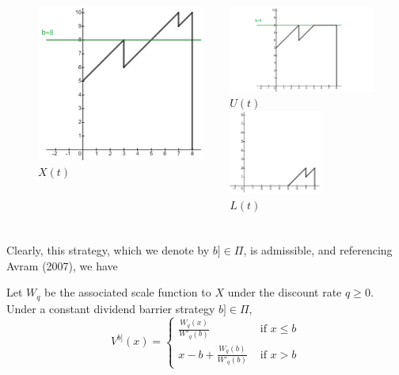 \documentclass[xcolor=pdftex,dvipsnames,table]{beamer}
\theoremstyle{definition}
\begin{document}
\begin{frame}
\frametitle{\insertsectionhead}
\begin{figure}
\begin{columns}
\begin{column}{0.5\textwidth}
\begin{center}
\includegraphics [width=2.2in]{divi1-1.png}
$X(t)$
\end{center}
\end{column}
\begin{column}{0.5\textwidth}  %
\begin{center}
\pause
\includegraphics [width=2.2in]{divi2-1.png}\\
$U(t)$\\
\pause
\includegraphics [width=1.2in]{divi3-1.png}\\
$L(t)$
\end{center}
\end{column}
\end{columns}
\end{figure}
\end{frame}

\begin{frame}
\frametitle{\insertsectionhead}
Clearly, this strategy, which we denote by $b] \in \Pi$, is admissible, and referencing Avram (2007), we have
\begin{theorem}
Let $W_q$ be the associated scale function to $X$ under the discount rate $q\geq 0$. Under a constant dividend barrier strategy $b] \in \Pi$,
\[ V^{b]} (x) = \begin{cases} 
\frac{W_q(x)}{W'_q(b)} & \text{ if $x \leq b$}\\
x - b + \frac{W_q(b)}{W'_q(b)} & \text{ if $x > b$}
\end{cases}
\]
\end{theorem}
\end{frame}
\end{document}
